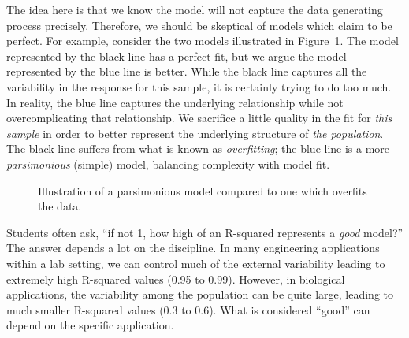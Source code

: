 \documentclass[
  letterpaper,
  DIV=11,
  numbers=noendperiod]{scrreprt}
\theoremstyle{definition}
\theoremstyle{definition}
\theoremstyle{plain}
\theoremstyle{remark}
\begin{document}
The idea here is that we know the model will not capture the data
generating process precisely. Therefore, we should be skeptical of
models which claim to be perfect. For example, consider the two models
illustrated in Figure~\ref{fig-regquality-overfit}. The model
represented by the black line has a perfect fit, but we argue the model
represented by the blue line is better. While the black line captures
all the variability in the response for this sample, it is certainly
trying to do too much. In reality, the blue line captures the underlying
relationship while not overcomplicating that relationship. We sacrifice
a little quality in the fit for \emph{this sample} in order to better
represent the underlying structure of \emph{the population}. The black
line suffers from what is known as \emph{overfitting}; the blue line is
a more \emph{parsimonious} (simple) model, balancing complexity with
model fit.

\begin{figure}


\caption{\label{fig-regquality-overfit}Illustration of a parsimonious
model compared to one which overfits the data.}

\end{figure}%

Students often ask, ``if not 1, how high of an R-squared represents a
\emph{good} model?'' The answer depends a lot on the discipline. In many
engineering applications within a lab setting, we can control much of
the external variability leading to extremely high R-squared values
(0.95 to 0.99). However, in biological applications, the variability
among the population can be quite large, leading to much smaller
R-squared values (0.3 to 0.6). What is considered ``good'' can depend on
the specific application.
\end{document}
